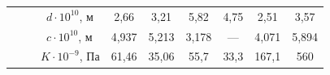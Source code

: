 \begin{table}[b!]
\begin{minipage}{.88\textwidth}
\begin{tabular}{p{3.8cm}|c|c|c|c|c|c}
\hline

~~~~~~$d\cdot 10^{10}$, м& 

2,66& 

3,21& 

5,82& 

4,75& 

2,51& 

3,57 \\


~~~~~~$c\cdot 10^{10}$, м& 

4,937& 

5,213& 

3,178& 

--- & 

4,071& 

5,894 \\


~~~~~$K\cdot 10^{-9}$, Па& 

61,46& 

35,06& 

55,7& 

33,3& 

167,1& 

560 \\

\hline

\end{tabular}

\end{minipage}

\end{table}



